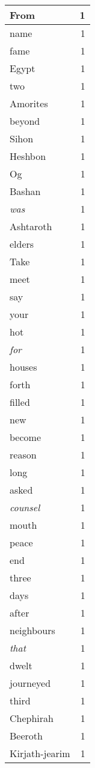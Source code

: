 \begin{center}
\begin{longtable}{l|r}
From & 1\\ \hline 
name & 1\\ \hline 
fame & 1\\ \hline 
Egypt & 1\\ \hline 
two & 1\\ \hline 
Amorites & 1\\ \hline 
beyond & 1\\ \hline 
Sihon & 1\\ \hline 
Heshbon & 1\\ \hline 
Og & 1\\ \hline 
Bashan & 1\\ \hline 
\emph{was} & 1\\ \hline 
Ashtaroth & 1\\ \hline 
elders & 1\\ \hline 
Take & 1\\ \hline 
meet & 1\\ \hline 
say & 1\\ \hline 
your & 1\\ \hline 
hot & 1\\ \hline 
\emph{for} & 1\\ \hline 
houses & 1\\ \hline 
forth & 1\\ \hline 
filled & 1\\ \hline 
new & 1\\ \hline 
become & 1\\ \hline 
reason & 1\\ \hline 
long & 1\\ \hline 
asked & 1\\ \hline 
\emph{counsel} & 1\\ \hline 
mouth & 1\\ \hline 
peace & 1\\ \hline 
end & 1\\ \hline 
three & 1\\ \hline 
days & 1\\ \hline 
after & 1\\ \hline 
neighbours & 1\\ \hline 
\emph{that} & 1\\ \hline 
dwelt & 1\\ \hline 
journeyed & 1\\ \hline 
third & 1\\ \hline 
Chephirah & 1\\ \hline 
Beeroth & 1\\ \hline 
Kirjath-jearim & 1\\ \hline 

\end{longtable}
\end{center}
